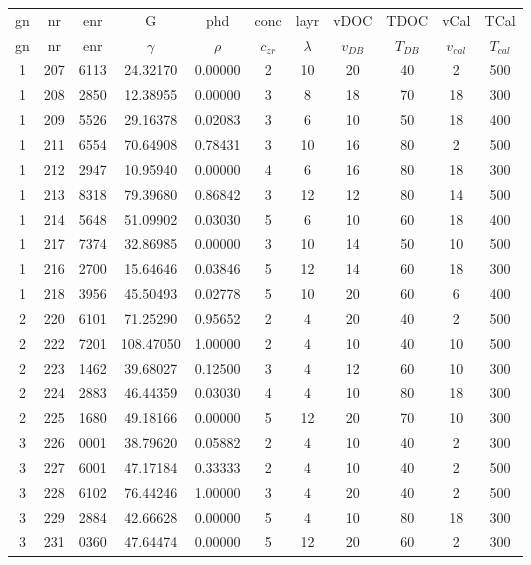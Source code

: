 \begin{table}[ht]
	\centering
	\label{tab:emma_all}
	\begin{tabular}{ccccccccccc}
        \hline\hline
        gn  &nr	    &enr	&G	&phd	&conc	    &layr	&vDOC	&TDOC	&vCal	&TCal\\
		gn  &nr	    &enr	&$\gamma$	&$\rho$	&$c_{zr}$	    &$\lambda$	&$v_{DB}$	&$T_{DB}$	&$v_{cal}$	&$T_{cal}$\\
        \hline
        1   &207	&6113	&24.32170	&0.00000	&2	&10	&20	&40	&2	&500\\
        1   &208	&2850	&12.38955	&0.00000	&3	&8	&18	&70	&18	&300\\
        1   &209	&5526	&29.16378	&0.02083	&3	&6	&10	&50	&18	&400\\
        1   &211	&6554	&70.64908	&0.78431	&3	&10	&16	&80	&2	&500\\
        1   &212	&2947	&10.95940	&0.00000	&4	&6	&16	&80	&18	&300\\
        1   &213	&8318	&79.39680	&0.86842	&3	&12	&12	&80	&14	&500\\
        1   &214	&5648	&51.09902	&0.03030	&5	&6	&10	&60	&18	&400\\
        1   &217	&7374	&32.86985	&0.00000	&3	&10	&14	&50	&10	&500\\
        1   &216	&2700	&15.64646	&0.03846	&5	&12	&14	&60	&18	&300\\
        1   &218	&3956	&45.50493	&0.02778	&5	&10	&20	&60	&6	&400\\

        2   &220	&6101	&71.25290	&0.95652	&2	&4	&20	&40	&2	&500\\
        2   &222	&7201	&108.47050	&1.00000	&2	&4	&10	&40	&10	&500\\
        2   &223	&1462	&39.68027	&0.12500	&3	&4	&12	&60	&10	&300\\
        2   &224	&2883	&46.44359	&0.03030	&4	&4	&10	&80	&18	&300\\
        2   &225	&1680	&49.18166	&0.00000	&5	&12	&20	&70	&10	&300\\

        3   &226	&0001	&38.79620	&0.05882	&2	&4	&10	&40	&2	&300\\
        3   &227	&6001	&47.17184	&0.33333	&2	&4	&10	&40	&2	&500\\
        3   &228	&6102	&76.44246	&1.00000	&3	&4	&20	&40	&2	&500\\
        3   &229	&2884	&42.66628	&0.00000	&5	&4	&10	&80	&18	&300\\
        3   &231	&0360	&47.64474	&0.00000	&5	&12	&20	&60	&2	&300\\


\end{tabular}
\end{table}
